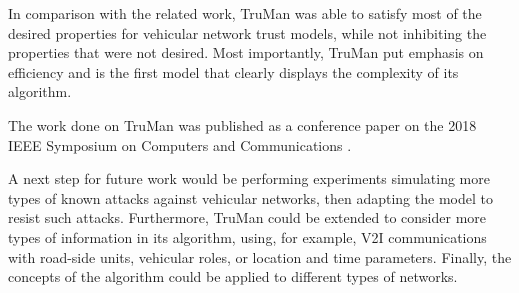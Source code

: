 In comparison with the related work, TruMan was able to satisfy most of the desired properties for vehicular network trust models, while not inhibiting the properties that were not desired.
Most importantly, TruMan put emphasis on efficiency and is the first model that clearly displays the complexity of its algorithm.

The work done on TruMan was published as a conference paper on the 2018 IEEE Symposium on Computers and Communications \citep{greca2018truman}.

A next step for future work would be performing experiments simulating more types of known attacks against vehicular networks, then adapting the model to resist such attacks.
Furthermore, TruMan could be extended to consider more types of information in its algorithm, using, for example, V2I communications with road-side units, vehicular roles, or location and time parameters.
Finally, the concepts of the algorithm could be applied to different types of networks.

